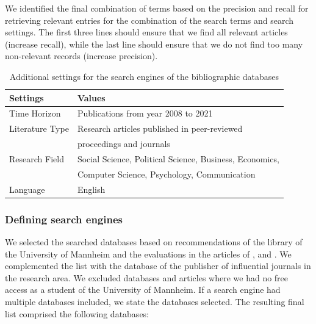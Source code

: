 We identified the final combination of terms based on the precision and recall for retrieving relevant entries for the combination of the search terms and search settings. The first three lines should ensure that we find all relevant articles (increase recall), while the last line should ensure that we do not find too many non-relevant records (increase precision).

\begin{table}
	\centering
	\begin{tabular}{ll}
		\toprule
		Settings & Values \\
		\midrule
		Time Horizon & Publications from year 2008 to 2021 \\ 
		Literature Type & Research articles published in peer-reviewed \\
		& proceedings and journals \\
		Research Field & Social Science, Political Science, Business, Economics, \\
		& Computer Science, Psychology, Communication \\
		Language & English \\
		\bottomrule 
	\end{tabular}
	\label{tab: search settings}
	\caption{Additional settings for the search engines of the bibliographic databases}
\end{table} 

\subsubsection{Defining search engines}
\label{subsubsec: Defining search engines}

We selected the searched databases based on recommendations of the library of the University of Mannheim and the evaluations in the articles of \cite{pascoe_systematic_2021}, \cite{papaioannou_literature_2010} and \cite{gusenbauer_which_2020}. We complemented the list with the database of the publisher of influential journals in the research area. We excluded databases and articles where we had no free access as a student of the University of Mannheim. If a search engine had multiple databases included, we state the databases selected. The resulting final list comprised the following databases:


